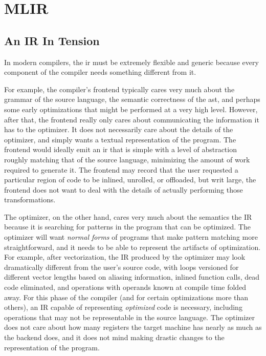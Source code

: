 \section{MLIR}

\subsection{An IR In Tension}

In modern compilers, the \gls{ir} must be extremely flexible and generic
because every component of the compiler needs something different from it.

For example, the compiler's frontend typically cares very much about the
grammar of the source language, the semantic correctness of the \gls{ast},
and perhaps some early optimizations that might be performed at a very high level.
However, after that, the frontend really only cares about communicating the information
it has to the optimizer. It does not necessarily care about the details of the
optimizer, and simply wants a textual representation of the program.
The frontend would ideally emit an \gls{ir} that is simple with a level of abstraction
roughly matching that of the source language, minimizing the amount of work required to generate it.
The frontend may record that the user requested a particular region of code to
be inlined, unrolled, or offloaded, but writ large, the frontend does not want to deal with
the details of actually performing those transformations.

The optimizer, on the other hand, cares very much about the semantics the IR
because it is searching for patterns in the program that can be optimized.
The optimizer will want \textit{normal forms} of programs that make pattern matching
more straightforward, and it needs to be able to represent the artifacts of
optimization.
For example, after vectorization, the IR produced by the optimizer may look dramatically
different from the user's source code, with loops versioned for different vector lengths
based on aliasing information, inlined function calls, dead code eliminated, and operations
with operands known at compile time folded away.
For this phase of the compiler (and for certain optimizations more than others),
an IR capable of representing \textit{optimized} code is necessary, including
operations that may not be representable in the source language.
The optimizer does not care about how many registers the target machine has
nearly as much as the backend does, and it does not mind making drastic changes
to the representation of the program.

